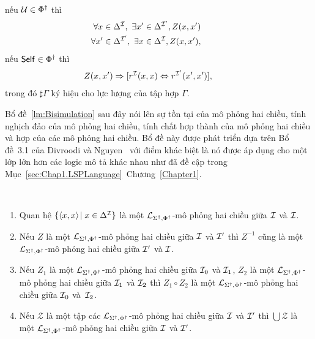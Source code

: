 \begin{Definition}[Mô phỏng hai chiều]
	nếu $\mathcal{U} \in \Phi^\dag$ thì
	\begin{eqnarray}
		&&\!\!\!\!\!\!\!\!\!\!\!\!\!\!\!\!\!\!\!\!\!\!\!\! 
		\V x \in \Delta^\mI,\ \E x' \in \Delta^{\mI'}, Z(x,x') \label{bs:eqU1} \\
		&&\!\!\!\!\!\!\!\!\!\!\!\!\!\!\!\!\!\!\!\!\!\!\!\! 
		\V x' \in \Delta^{\mI'},\ \E x \in \Delta^\mI, Z(x,x'), \label{bs:eqU2}
	\end{eqnarray}
	nếu $\mathsf{Self} \in \Phi^\dag$ thì
	\begin{eqnarray}
		&&\!\!\!\!\!\!\!\!\!\!\!\!\!\!\!\!\!\!\!\!\!
		Z(x,x') \Rightarrow [r^\mI(x,x) \Leftrightarrow r^{\mI'}(x',x')], \label{bs:eqSelf}
	\end{eqnarray}
	trong đó $\sharp\Gamma$ ký hiệu cho lực lượng của tập hợp $\Gamma$.\myend
\end{Definition}

Bổ đề~\ref{lm:Bisimulation} sau đây nói lên sự tồn tại của mô phỏng hai chiều, tính nghịch đảo của mô phỏng hai chiều, tính chất hợp thành của mô phỏng hai chiều và hợp của các mô phỏng hai chiều. 
Bổ đề này được phát triển dựa trên Bổ đề~3.1 của Divroodi và Nguyen~\cite{Divroodi2011B} với điểm khác biệt là nó được áp dụng cho một lớp lớn hơn các logic mô tả khác nhau như đã đề cập trong Mục~\ref{sec:Chap1.LSPLanguage}~Chương~\ref{Chapter1}.
\begin{Lemma}
\label{lm:Bisimulation}~
	\begin{enumerate}
		\item Quan hệ $\{\left\langle x,x\right\rangle\! \mid x \in \Delta^{\mathcal{I}}\}$ là một $\mathcal{L}_{\Sigma^\dag,\Phi^\dag}$-mô phỏng hai chiều giữa $\mathcal{I}$ và $\mathcal{I}$.\label{lm:item1}
		\item Nếu $Z$ là một $\mathcal{L}_{\Sigma^\dag,\Phi^\dag}$-mô phỏng hai chiều giữa $\mathcal{I}$ và $\mathcal{I}'$ thì $Z^{-1}$ cũng là một $\mathcal{L}_{\Sigma^\dag,\Phi^\dag}$-mô phỏng hai chiều giữa $\mathcal{I}'$ và $\mathcal{I}$.\label{lm:item2}
		\item Nếu $Z_1$ là một $\mathcal{L}_{\Sigma^\dag,\Phi^\dag}$-mô phỏng hai chiều giữa $\mathcal{I}_0$ và $\mathcal{I}_1$, $Z_2$ là một $\mathcal{L}_{\Sigma^\dag,\Phi^\dag}$-mô phỏng hai chiều giữa $\mathcal{I}_1$ và $\mathcal{I}_2$ thì $Z_1 \circ Z_2$ là một $\mathcal{L}_{\Sigma^\dag,\Phi^\dag}$-mô phỏng hai chiều giữa $\mathcal{I}_0$ và~$\mathcal{I}_2$.\label{lm:item3}
		\item Nếu $\mathcal{Z}$ là một tập các $\mathcal{L}_{\Sigma^\dag,\Phi^\dag}$-mô phỏng hai chiều giữa $\mathcal{I}$ và $\mathcal{I}'$ thì $\bigcup \mathcal{Z}$ là một $\mathcal{L}_{\Sigma^\dag,\Phi^\dag}$-mô phỏng hai chiều giữa $\mathcal{I}$ và $\mathcal{I}'$.\label{lm:item4}\myend
	\end{enumerate}
\end{Lemma}

